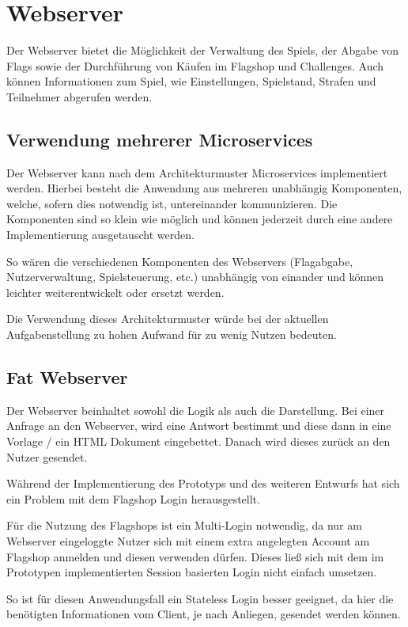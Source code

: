\section{Webserver} \label{sec:Webserver}
Der Webserver bietet die Möglichkeit der Verwaltung des Spiels, der Abgabe von Flags sowie der Durchführung von Käufen im Flagshop und Challenges. Auch können Informationen zum Spiel, wie Einstellungen, Spielstand, Strafen und Teilnehmer abgerufen werden.

\subsection{Verwendung mehrerer Microservices}
Der Webserver kann nach dem Architekturmuster Microservices implementiert werden. Hierbei besteht die Anwendung aus mehreren unabhängig Komponenten, welche, sofern dies notwendig ist, untereinander kommunizieren. Die Komponenten sind so klein wie möglich und können jederzeit durch eine andere Implementierung ausgetauscht werden.\cite{wolffMicroservicesGrundlagenFlexibler2015} 

So wären die verschiedenen Komponenten des Webservers (Flagabgabe, Nutzerverwaltung, Spielsteuerung, etc.) unabhängig von einander und können leichter weiterentwickelt oder ersetzt werden.

Die Verwendung dieses Architekturmuster würde bei der aktuellen Aufgabenstellung zu hohen Aufwand für zu wenig Nutzen bedeuten.

\subsection{Fat Webserver}
Der Webserver beinhaltet sowohl die Logik als auch die Darstellung. Bei einer Anfrage an den Webserver, wird eine Antwort bestimmt und diese dann in eine Vorlage / ein HTML Dokument eingebettet. Danach wird dieses zurück an den Nutzer gesendet.

Während der Implementierung des Prototyps und des weiteren Entwurfs hat sich ein Problem mit dem Flagshop Login herausgestellt.

Für die Nutzung des Flagshops ist ein Multi-Login notwendig, da nur am Webserver eingeloggte Nutzer sich mit einem extra angelegten Account am Flagshop anmelden und diesen verwenden dürfen. Dieses ließ sich mit dem im Prototypen implementierten Session basierten Login nicht einfach umsetzen. 

So ist für diesen Anwendungsfall ein Stateless Login besser geeignet, da hier die benötigten Informationen vom Client, je nach Anliegen, gesendet werden können. 


